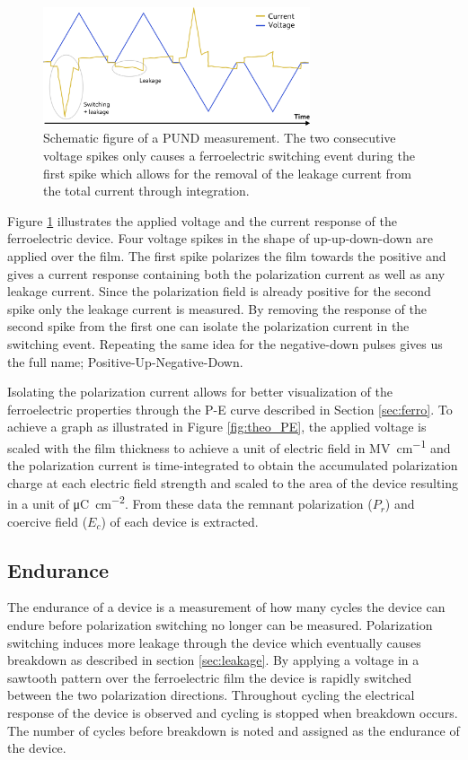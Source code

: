 \documentclass[11pt,twoside,final]{eitExjobb}  %
\begin{document}
\begin{figure}[htbp]
    \centering
    \includegraphics[width=0.70\textwidth]{fig/img/PUND.png}
    \caption{Schematic figure of a PUND measurement. The two consecutive
    voltage spikes only causes a ferroelectric switching event during the first
    spike which allows for the removal of the leakage current from the total
    current through integration.}
    \label{fig:char_PUND}
\end{figure}

Figure \ref{fig:char_PUND} illustrates the applied voltage and the current
response of the ferroelectric device. Four voltage spikes in the shape of
up-up-down-down are applied over the film. The first spike polarizes the film
towards the positive and gives a current response containing both the
polarization current as well as any leakage current. Since the polarization
field is already positive for the second spike only the leakage current is
measured. By removing the response of the second spike from the first one can
isolate the polarization current in the switching event. Repeating the same
idea for the negative-down pulses gives us the full name;
Positive-Up-Negative-Down.

Isolating the polarization current allows for better visualization of the
ferroelectric properties through the P-E curve described in Section
\ref{sec:ferro}. To achieve a graph as illustrated in Figure \ref{fig:theo_PE},
the applied voltage is scaled with the film thickness to achieve a unit of
electric field in \si{\mega\volt\per\centi\meter} and the polarization current
is time-integrated to obtain the accumulated polarization charge at each
electric field strength and scaled to the area of the device resulting in a
unit of \si{\micro\coulomb\per\centi\meter\squared}. From these data the
remnant polarization ($P_r$) and coercive field ($E_c$) of each device is
extracted.

\subsection{Endurance}\label{sec:Endu}
The endurance of a device is a measurement of how many cycles the device can
endure before polarization switching no longer can be measured. Polarization
switching induces more leakage through the device which eventually causes
breakdown as described in section \ref{sec:leakage}. By applying a voltage in a
sawtooth pattern over the ferroelectric film the device is rapidly switched
between the two polarization directions. Throughout cycling the electrical
response of the device is observed and cycling is stopped when breakdown
occurs. The number of cycles before breakdown is noted and assigned as the
endurance of the device.
\end{document}

